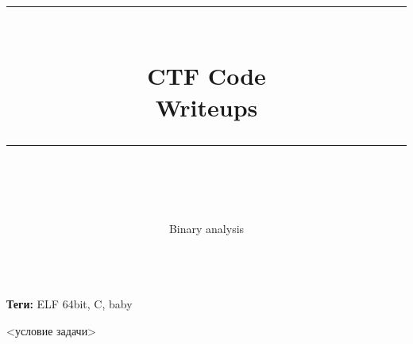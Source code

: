 \documentclass[idxtotoc,hyperref,openany,oneside]{files/pwn} %
\newcommand{\HRule}{\rule{\linewidth}{0.5mm}} %
\begin{document}

\frontmatter %
\title{
\begin{center}
\HRule \\[0.4cm]
{\Huge \bfseries CTF Code \\[0.5cm] \Large Writeups}\\[0.4cm] %
\HRule \\[1.5cm]
\end{center}
}
\author{\Huge Binary analysis \\ \\[2cm]} %
\maketitle

\tableofcontents

\mainmatter %












\textbf{Теги:} ELF 64bit, C, baby\vspace{\baselineskip}

\begin{tcolorbox}
<условие задачи>
\end{tcolorbox}
\end{document}
